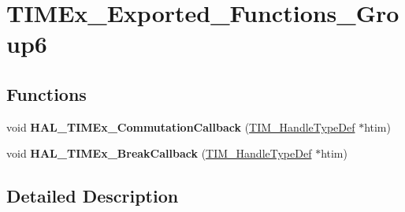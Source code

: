 \hypertarget{group___t_i_m_ex___exported___functions___group6}{}\section{T\+I\+M\+Ex\+\_\+\+Exported\+\_\+\+Functions\+\_\+\+Group6}
\label{group___t_i_m_ex___exported___functions___group6}
\subsection*{Functions}
\begin{DoxyCompactItemize}
\item 
\mbox{\label{group___t_i_m_ex___exported___functions___group6_ga5b08c045ccb306ada81a0c8436a0c1ec}} 
void {\bfseries H\+A\+L\+\_\+\+T\+I\+M\+Ex\+\_\+\+Commutation\+Callback} (\hyperlink{struct_t_i_m___handle_type_def}{T\+I\+M\+\_\+\+Handle\+Type\+Def} $\ast$htim)
\item 
\mbox{\label{group___t_i_m_ex___exported___functions___group6_ga2d868a55ca7c62c4a5ef85dec514402c}} 
void {\bfseries H\+A\+L\+\_\+\+T\+I\+M\+Ex\+\_\+\+Break\+Callback} (\hyperlink{struct_t_i_m___handle_type_def}{T\+I\+M\+\_\+\+Handle\+Type\+Def} $\ast$htim)
\end{DoxyCompactItemize}


\subsection{Detailed Description}
